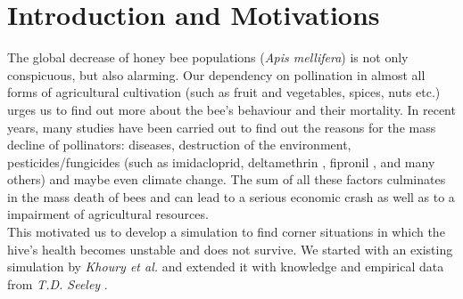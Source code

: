 \section{Introduction and Motivations}
The global decrease of honey bee populations (\textit{Apis mellifera}) is not only conspicuous, but also alarming. Our dependency on pollination in almost all forms of agricultural cultivation (such as fruit and vegetables, spices, nuts etc.) urges us to find out more about the bee's behaviour and their mortality. In recent years, many studies \cite{potts10} \cite{thomann13} have been carried out to find out the reasons for the mass decline of pollinators: diseases, destruction of the environment, pesticides/fungicides (such as imidacloprid, deltamethrin \cite{decourtye04}, fipronil \cite{bernadou09}, and many others) and maybe even climate change. The sum of all these factors culminates in the mass death of bees and can lead to a serious economic crash as well as to a impairment of agricultural resources.\\
This motivated us to develop a simulation to find corner situations in which the hive's health becomes unstable and does not survive. We started with an existing simulation by \textit{Khoury et al.} \cite{khoury13} and extended it with knowledge and empirical data from \textit{T.D. Seeley} \cite{seeley95}.